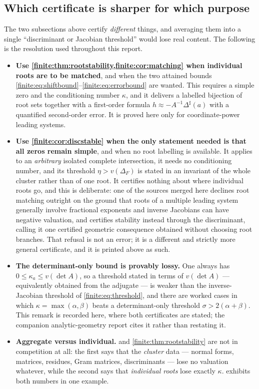 \documentclass[11pt,letterpaper]{article}
\theoremstyle{definition}
\theoremstyle{remark}
\newcommand{\sh}{^{\sharp}}
\numberwithin{equation}{section}
\begin{document}
\subsection{Which certificate is sharper for which purpose}
\label{finite:sec:whichcertificate}

The two subsections above certify \emph{different} things, and averaging them into a single ``discriminant or Jacobian threshold'' would lose real content. The following is the resolution used throughout this report.

\begin{itemize}
\item \textbf{Use \cref{finite:thm:rootstability,finite:cor:matching} when individual roots are to be matched}, and when the two attained bounds \eqref{finite:eq:shiftbound}--\eqref{finite:eq:errorbound} are wanted. This requires a simple zero and the conditioning number $\kappa$, and it delivers a labelled bijection of root sets together with a first-order formula $h\approx-A^{-1}\Delta\sh(a)$ with a quantified second-order error. It is proved here only for coordinate-power leading systems.
\item \textbf{Use \cref{finite:cor:discstable} when the only statement needed is that all zeros remain simple}, and when no root labelling is available. It applies to an \emph{arbitrary} isolated complete intersection, it needs no conditioning number, and its threshold $\eta>v(\Delta_F)$ is stated in an invariant of the whole cluster rather than of one root. It certifies nothing about where individual roots go, and this is deliberate: one of the sources merged here declines root matching outright on the ground that roots of a multiple leading system generally involve fractional exponents and inverse Jacobians can have negative valuation, and certifies stability instead through the discriminant, calling it one certified geometric consequence obtained without choosing root branches. That refusal is not an error; it is a different and strictly more general certificate, and it is printed above as such.
\item \textbf{The determinant-only bound is provably lossy.} One always has $0\leq\kappa_a\leq v(\det A)$, so a threshold stated in terms of $v(\det A)$ --- equivalently obtained from the adjugate --- is weaker than the inverse-Jacobian threshold of \eqref{finite:eq:threshold}, and there are worked cases in which $\kappa=\max(\alpha,\beta)$ beats a determinant-only threshold $\sigma>2(\alpha+\beta)$. This remark is recorded here, where both certificates are stated; the companion analytic-geometry report cites it rather than restating it.
\item \textbf{Aggregate versus individual.}  and \cref{finite:thm:rootstability} are not in competition at all: the first says that the \emph{cluster} data --- normal forms, matrices, residues, Gram matrices, discriminants --- lose no valuation whatever, while the second says that \emph{individual roots} lose exactly $\kappa$.  exhibits both numbers in one example.
\end{itemize}
\end{document}
